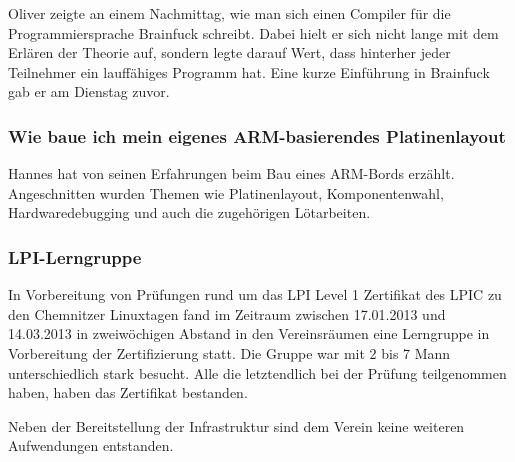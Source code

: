 \documentclass[10pt,DIV16]{scrartcl}
\begin{document}
Oliver zeigte an einem Nachmittag, wie man sich einen Compiler für die 
Programmiersprache Brainfuck schreibt. Dabei hielt er sich nicht lange mit 
dem Erlären der Theorie auf, sondern legte darauf Wert, dass hinterher jeder 
Teilnehmer ein lauffähiges Programm hat. Eine kurze Einführung in Brainfuck 
gab er am Dienstag zuvor. 

\subsubsection{Wie baue ich mein eigenes ARM-basierendes Platinenlayout}

Hannes hat von seinen Erfahrungen beim Bau eines ARM-Bords erzählt. 
Angeschnitten wurden Themen wie Platinenlayout, Komponentenwahl, 
Hardwaredebugging und auch die zugehörigen Lötarbeiten. 

\subsubsection{LPI-Lerngruppe}

In Vorbereitung von Prüfungen rund um das LPI Level 1 Zertifikat des
LPIC zu den Chemnitzer Linuxtagen fand im Zeitraum zwischen
17.01.2013 und 14.03.2013 in zweiwöchigen Abstand in den Vereinsräumen
eine Lerngruppe in Vorbereitung der Zertifizierung statt. Die Gruppe
war mit 2 bis 7 Mann unterschiedlich stark besucht. Alle die
letztendlich bei der Prüfung teilgenommen haben, haben das
Zertifikat bestanden.

Neben der Bereitstellung der Infrastruktur sind dem Verein keine
weiteren Aufwendungen entstanden.
\end{document}
